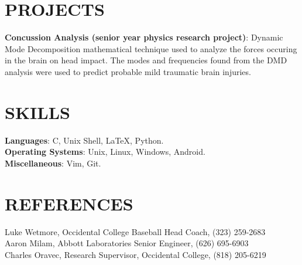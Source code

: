 \documentclass[margin]{res}
\begin{document}
\begin{resume}
\section{PROJECTS}
\par
\textbf{Concussion Analysis (senior year physics research project)}: 
Dynamic Mode Decomposition mathematical technique used to analyze the forces occuring in the brain on head impact. The modes and frequencies found from the DMD analysis were used to predict probable mild traumatic brain injuries.

\section{SKILLS}

\textbf{Languages}: C, Unix Shell, \LaTeX, Python.
\\
\textbf{Operating Systems}: Unix, Linux, Windows, Android.
\\
\textbf{Miscellaneous}: Vim, Git.

\section{REFERENCES}
Luke Wetmore, Occidental College Baseball Head Coach, (323) 259-2683 \\
Aaron Milam, Abbott Laboratories Senior Engineer, (626) 695-6903 \\
Charles Oravec, Research Supervisor, Occidental College, (818) 205-6219
\end{resume}
\end{document}
